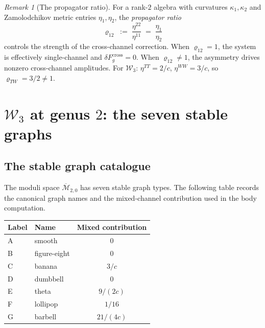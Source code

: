 \documentclass[11pt]{article}
\theoremstyle{definition}
\theoremstyle{remark}
\newtheorem{remark}[theorem]{Remark}
\newcommand{\cM}{\mathcal{M}}
\newcommand{\Walg}{\mathcal{W}}
\newcommand{\cross}{\mathrm{cross}}
\numberwithin{equation}{section}
\begin{document}
\begin{remark}[The propagator ratio]\label{rem:propagator-ratio}
For a rank-$2$ algebra with curvatures $\kappa_1, \kappa_2$
and Zamolodchikov metric entries $\eta_1, \eta_2$, the
\emph{propagator ratio}
\begin{equation}\label{eq:propagator-ratio}
 \varrho_{12}
 \;:=\;
 \frac{\eta^{22}}{\eta^{11}}
 \;=\;
 \frac{\eta_1}{\eta_2}
\end{equation}
controls the strength of the cross-channel correction.
When $\varrho_{12} = 1$, the system is effectively
single-channel and $\delta F_g^{\cross} = 0$.
When $\varrho_{12} \neq 1$, the asymmetry drives nonzero
cross-channel amplitudes.
For $\Walg_3$: $\eta^{TT} = 2/c$, $\eta^{WW} = 3/c$,
so $\varrho_{TW} = 3/2 \neq 1$.
\end{remark}


\section{$\Walg_3$ at genus $2$: the seven stable graphs}
\label{sec:w3-genus2}

\subsection{The stable graph catalogue}

The moduli space $\overline{\cM}_{2,0}$ has seven
stable graph types.
The following table records the canonical graph names and the
mixed-channel contribution used in the body computation.

\begin{center}
\small
\renewcommand{\arraystretch}{1.35}
\begin{tabular}{llc}
\toprule
Label & Name & Mixed contribution \\
\midrule
A & smooth & $0$ \\
B & figure-eight & $0$ \\
C & banana & $3/c$ \\
D & dumbbell & $0$ \\
E & theta & $9/(2c)$ \\
F & lollipop & $1/16$ \\
G & barbell & $21/(4c)$ \\
\bottomrule
\end{tabular}
\end{center}
\end{document}
